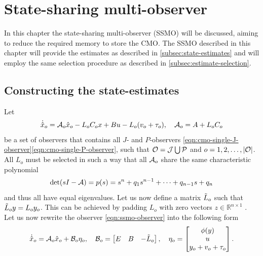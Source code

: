 \section{State-sharing multi-observer}\label{ch:ssmo}
In this chapter the state-sharing multi-observer (SSMO) will be discussed, aiming to reduce the required memory to store the CMO. The SSMO described in this chapter will provide the estimates as described in \autoref{subsec:state-estimates} and will employ the same selection procedure as described in \autoref{subsec:estimate-selection}.

\subsection{Constructing the state-estimates}
Let
\begin{equation}\label{eqn:ssmo-observer}
    \begin{split}
        \dot{\hat{x}}_o &= \mathcal{A}_o\hat{x}_o - L_oC_ox + Bu -L_o(v_o + \tau_o), \quad \mathcal{A}_o=A+L_{o}C_{o} \\
    \end{split}
\end{equation}
be a set of observers that contains all $J$- and $P$-observers \eqref{eqn:cmo-single-J-observer}\eqref{eqn:cmo-single-P-observer}, such that $\mathcal{O}=\mathcal{J}\bigcup\mathcal{P}$ and $o=1,2,\dots,|\mathcal{O}|$. All $L_o$ must be selected in such a way that all $\mathcal{A}_o$ share the same characteristic polynomial
\begin{equation}\label{eqn:ssmo-char-poly}
    \det(sI-\mathcal{A}) = p(s) = s^n + q_1s^{n-1} + \dots + q_{n-1}s + q_n
\end{equation}
and thus all have equal eigenvalues. Let us now define a matrix $\Tilde{L}_{o}$ such that $\Tilde{L}_oy=L_oy_o$. This can be achieved by padding $L_o$ with zero vectors $z \in \mathbb{R}^{n \times 1}$ \cite{Chong2023MemoryAlgorithms}. Let us now rewrite the observer \eqref{eqn:ssmo-observer} into the following form
\begin{equation}\label{eqn:ssmo-standard-system-form}
    \dot{\hat{x}}_o = \mathcal{A}_o\hat{x}_o + \mathcal{B}_o\eta_o, \quad
    \mathcal{B}_o =
    \begin{bmatrix}
        E & B & -\Tilde{L}_o \\
    \end{bmatrix}, \quad \eta_o =
    \begin{bmatrix}
        \phi(y) \\
        u \\
        y_o + v_o + \tau_o
    \end{bmatrix}.
\end{equation}

